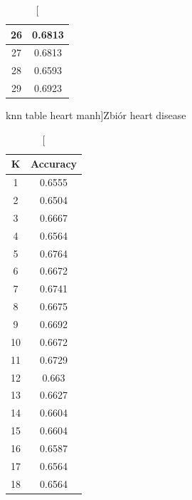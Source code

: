 \documentclass{classrep}
\begin{document}
{{{\begin{table}[!htbp]
\begin{minipage}{.35\textwidth}
\begin{tabular}{|c|c|}
                            26 & 0.6813 \\ \hline
                            27 & 0.6813 \\ \hline
                            28 & 0.6593 \\ \hline
                            29 & 0.6923 \\ \hline
                        \end{tabular}
                        \caption
                        [knn table heart manh]{Zbiór heart disease}
                        \label{knn_table_heart_manh}
                    \end{minipage}
                    \hfill
                    \begin{minipage}{.3\textwidth}
                        \centering
                        \begin{tabular}{|c|c|}
                            \hline
                            K & Accuracy \\ \hline
                            1 & 0.6555 \\ \hline
                            2 & 0.6504 \\ \hline
                            3 & 0.6667 \\ \hline
                            4 & 0.6564 \\ \hline
                            5 & 0.6764 \\ \hline
                            6 & 0.6672 \\ \hline
                            7 & 0.6741 \\ \hline
                            8 & 0.6675 \\ \hline
                            9 & 0.6692 \\ \hline
                            10 & 0.6672 \\ \hline
                            11 & 0.6729 \\ \hline
                            12 & 0.663 \\ \hline
                            13 & 0.6627 \\ \hline
                            14 & 0.6604 \\ \hline
                            15 & 0.6604 \\ \hline
                            16 & 0.6587 \\ \hline
                            17 & 0.6564 \\ \hline
                            18 & 0.6564 \\ \hline

\end{tabular}
\end{minipage}
\end{table}}}}
\end{document}
